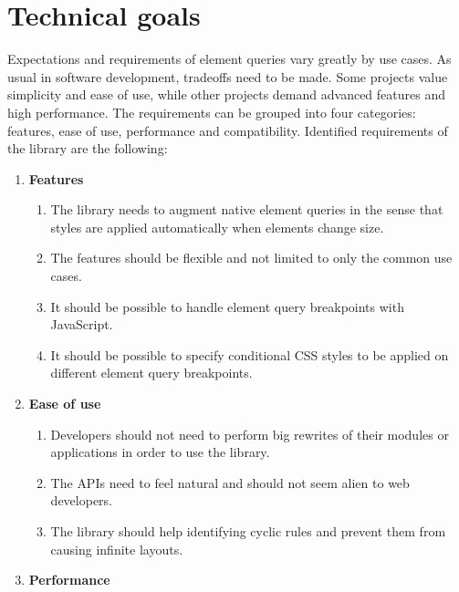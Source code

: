 \documentclass[a4paper,11pt]{kth-mag}
\begin{document}
    \section{Technical goals}\label{sec:techincal-goals}
      Expectations and requirements of element queries vary greatly by use cases.
      As usual in software development, tradeoffs need to be made.
      Some projects value simplicity and ease of use, while other projects demand advanced features and high performance.
      The requirements can be grouped into four categories: features, ease of use, performance and compatibility.
      Identified requirements of the library are the following:
      \begin{enumerate}
        \item \textbf{Features}
          \begin{enumerate}
            \item\label{itm:req_resize_detect}    The library needs to augment \gls{native} element queries in the sense that styles are applied automatically when \glspl{element} change size.
            \item\label{itm:req_flexible}         The features should be flexible and not limited to only the common use cases.
            \item\label{itm:req_bp_js}            It should be possible to handle element query breakpoints with JavaScript.
            \item\label{itm:req_conditional_css}  It should be possible to specify conditional \gls{CSS} styles to be applied on different element query breakpoints.
          \end{enumerate}
        \item \textbf{Ease of use}
          \begin{enumerate}
            \item\label{itm:req_big_rewrite}      Developers should not need to perform big rewrites of their modules or applications in order to use the library.
            \item\label{itm:natural}              The \glspl{API} need to feel natural and should not seem alien to \gls{web} developers.
            \item\label{itm:req_cyclic_rules}     The library should help identifying cyclic rules and prevent them from causing infinite layouts.
          \end{enumerate}
        \item \textbf{Performance}
          \begin{enumerate}

\end{enumerate}
\end{enumerate}
\end{document}
